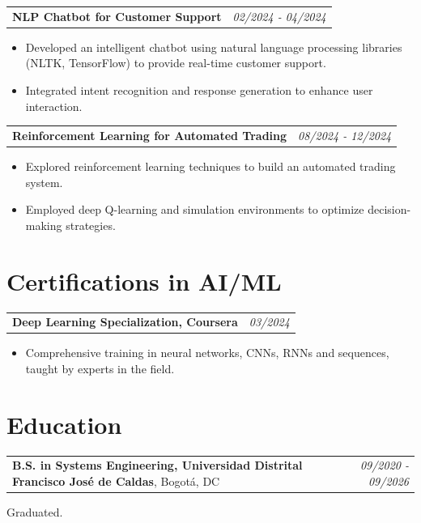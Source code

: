 \documentclass[letterpaper,12pt]{article}
\begin{document}
\noindent\begin{tabularx}{\textwidth}{Xr}
    \textbf{NLP Chatbot for Customer Support} & \textit{02/2024 - 04/2024} \\
\end{tabularx}
\begin{itemize}
    \item Developed an intelligent chatbot using natural language processing libraries (NLTK, TensorFlow) to provide real-time customer support.
    \item Integrated intent recognition and response generation to enhance user interaction.
\end{itemize}

\noindent\begin{tabularx}{\textwidth}{Xr}
    \textbf{Reinforcement Learning for Automated Trading} & \textit{08/2024 - 12/2024} \\
\end{tabularx}
\begin{itemize}
    \item Explored reinforcement learning techniques to build an automated trading system.
    \item Employed deep Q-learning and simulation environments to optimize decision-making strategies.
\end{itemize}

\section*{\textcolor{primary}{Certifications in AI/ML}}
\noindent\begin{tabularx}{\textwidth}{Xr}
    \textbf{Deep Learning Specialization, Coursera} & \textit{03/2024} \\
\end{tabularx}
\begin{itemize}
    \item Comprehensive training in neural networks, CNNs, RNNs and sequences, taught by experts in the field.
\end{itemize}

\section*{\textcolor{primary}{Education}}

\noindent\begin{tabularx}{\textwidth}{Xr}
    \textbf{B.S. in Systems Engineering, Universidad Distrital Francisco José de Caldas}, Bogotá, DC & \textit{09/2020 - 09/2026} \\
\end{tabularx}
Graduated.
\end{document}
